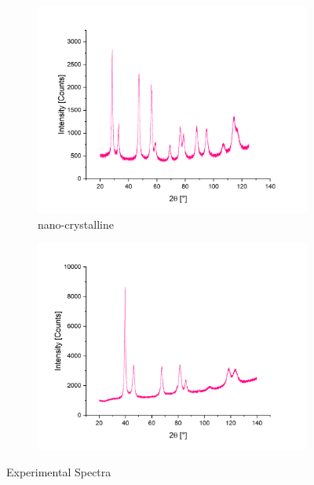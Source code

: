 \documentclass[12pt]{article}
\begin{document}
\begin{figure}[!ht]
    \begin{subfigure}{0.5\textwidth}
        \centering
        \includegraphics[width=\linewidth]{2_XRD/Graphics/Experiments/Spectra/Spectrum_CeO2_2.png}
        \caption{nano-crystalline }
    \end{subfigure}
    \begin{subfigure}{0.5\textwidth}
        \centering
        \includegraphics[width=\linewidth]{2_XRD/Graphics/Experiments/Spectra/Spectrum_Pd90Au10.png}
        \caption{}
    \end{subfigure}
    
    \caption{Experimental Spectra}
    \label{fig:ExperimentalSpectra}
\end{figure}
\end{document}
